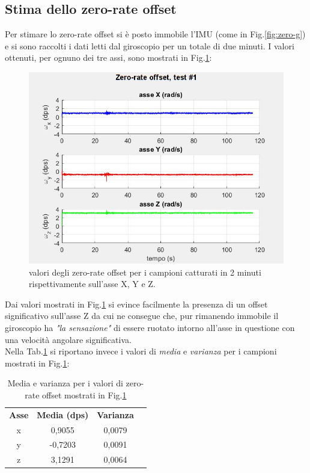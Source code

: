 \subsection{Stima dello zero-rate offset}
Per stimare lo zero-rate offset si è posto immobile l'IMU (come in Fig.\ref{fig:zero-g}) e si sono raccolti i dati letti dal giroscopio per un totale di due minuti. I valori ottenuti, per ognuno dei tre assi, sono mostrati in Fig.\ref{fig:zero-rate}:
\begin{figure}[H]  
	\centering 
	\includegraphics[scale=0.6]{analisi/zero-rate.jpg}
	\caption{valori degli zero-rate offset per i campioni catturati in 2 minuti rispettivamente sull'asse X, Y e Z.}
	\label{fig:zero-rate}
\end{figure}
Dai valori mostrati in Fig.\ref{fig:zero-rate} si evince facilmente la presenza di un offset significativo sull'asse Z da cui ne consegue che, pur rimanendo immobile il giroscopio ha \textit{"la sensazione"} di essere ruotato intorno all'asse in questione con una velocità angolare significativa.\\
Nella Tab.\ref{tab:zero-rate} si riportano invece i valori di \textit{media} e \textit{varianza} per i campioni mostrati in Fig.\ref{fig:zero-rate}:
\begin{table}[H]
	\centering
	\label{tab:zero-rate}
	\begin{tabular}{|c|c|c|l}
		\cline{1-3}
		\textbf{Asse} & \multicolumn{1}{l|}{\textbf{Media (dps)}} & \multicolumn{1}{l|}{\textbf{Varianza}} &  \\ \cline{1-3}
		x             & 0,9055                                    & 0,0079                                 &  \\ \cline{1-3}
		y             & -0,7203                                   & 0,0091                                 &  \\ \cline{1-3}
		z             & 3,1291                                    & 0,0064                                 &  \\ \cline{1-3}
	\end{tabular}
	\caption{Media e varianza per i valori di zero-rate offset mostrati in Fig.\ref{fig:zero-rate}}
\end{table}
